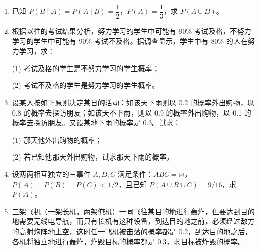 \begin{enumerate}
	\item 已知 $P(B \mid A) = P(A \mid B) = \dfrac{1}{2}$，$P(A) = \dfrac{1}{3}$，求 $P(A \cup B)$。
	
	\vspace{5cm}
	
	\item 根据以往的考试结果分析，努力学习的学生中可能有 90\% 考试及格，不努力学习的学生中可能有 90\% 考试不及格。据调查显示，学生中有 80\% 的人在努力学习，求：
	\par (1) 考试及格的学生是不努力学习的学生概率；
	\par (2) 考试不及格的学生是努力学习的学生概率。
	
	\vspace*{2cm}
	
	\item 设某人按如下原则决定某日的活动：如该天下雨则以 0.2 的概率外出购物，以 0.8 的概率去探访朋友；如该天不下雨，则以 0.9 的概率外出购物，以 0.1 的概率去探访朋友。又设某地下雨的概率是 0.3。试求：
	\par (1) 那天他外出购物的概率；
	\par (2) 若已知他那天外出购物，试求那天下雨的概率。
	
	\vspace{5cm}
	
	\item 设两两相互独立的三事件 $A, B, C$ 满足条件：$ABC = \varnothing$，$P(A) = P(B) = P(C) < 1/2$，且已知 $P(A \cup B \cup C) = 9/16$，求 $P(A)$。
	
	\vspace{5cm}
	
	\item 三架飞机（一架长机，两架僚机）一同飞往某目的地进行轰炸，但要达到目的地需要无线电导航，而只有长机有这种设备，到达目的地之前，必须经过敌方的高射炮阵地上空，这时任一飞机被击落的概率都是 0.2，到达目的地之后，各机将独立地进行轰炸，炸毁目标的概率都是 0.3，求目标被炸毁的概率。
\end{enumerate}

\newpage

